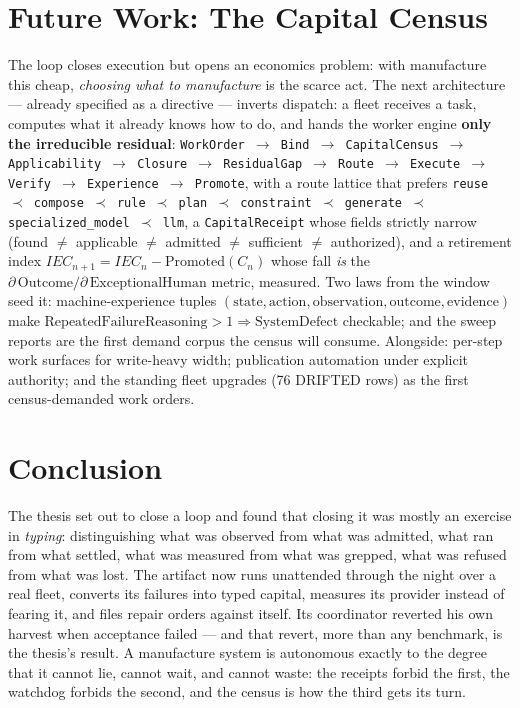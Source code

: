 \documentclass[11pt,a4paper]{article}
\theoremstyle{remark}
\newcommand{\term}[1]{\texttt{#1}}
\begin{document}
\section{Future Work: The Capital Census}
The loop closes execution but opens an economics problem: with manufacture this cheap, \emph{choosing what to manufacture} is the scarce act. The next architecture --- already specified as a directive --- inverts dispatch: a fleet receives a task, computes what it already knows how to do, and hands the worker engine \textbf{only the irreducible residual}: \term{WorkOrder $\to$ Bind $\to$ CapitalCensus $\to$ Applicability $\to$ Closure $\to$ ResidualGap $\to$ Route $\to$ Execute $\to$ Verify $\to$ Experience $\to$ Promote}, with a route lattice that prefers \term{reuse $\prec$ compose $\prec$ rule $\prec$ plan $\prec$ constraint $\prec$ generate $\prec$ specialized\_model $\prec$ llm}, a \term{CapitalReceipt} whose fields strictly narrow (found $\neq$ applicable $\neq$ admitted $\neq$ sufficient $\neq$ authorized), and a retirement index $IEC_{n+1} = IEC_n - \mathrm{Promoted}(C_n)$ whose fall \emph{is} the $\partial\,\mathrm{Outcome}/\partial\,\mathrm{ExceptionalHuman}$ metric, measured. Two laws from the window seed it: machine-experience tuples $(\mathrm{state}, \mathrm{action}, \mathrm{observation}, \mathrm{outcome}, \mathrm{evidence})$ make $\mathrm{RepeatedFailureReasoning} > 1 \Rightarrow \mathrm{SystemDefect}$ checkable; and the sweep reports are the first demand corpus the census will consume. Alongside: per-step work surfaces for write-heavy width; publication automation under explicit authority; and the standing fleet upgrades (76 DRIFTED rows) as the first census-demanded work orders.

\section{Conclusion}
The thesis set out to close a loop and found that closing it was mostly an exercise in \emph{typing}: distinguishing what was observed from what was admitted, what ran from what settled, what was measured from what was grepped, what was refused from what was lost. The artifact now runs unattended through the night over a real fleet, converts its failures into typed capital, measures its provider instead of fearing it, and files repair orders against itself. Its coordinator reverted his own harvest when acceptance failed --- and that revert, more than any benchmark, is the thesis's result. A manufacture system is autonomous exactly to the degree that it cannot lie, cannot wait, and cannot waste: the receipts forbid the first, the watchdog forbids the second, and the census is how the third gets its turn.
\end{document}

